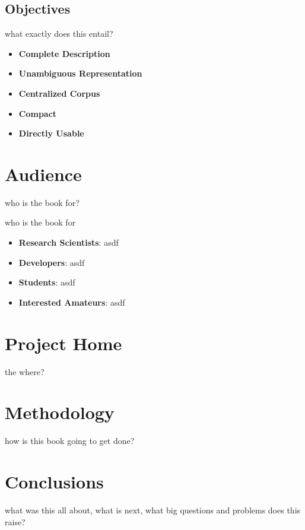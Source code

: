 \documentclass[a4paper, 11pt]{article}
\begin{document}
\subsection{Objectives}

what exactly does this entail?

\begin{itemize}
	\item \textbf{Complete Description}
	\item \textbf{Unambiguous Representation}
	\item \textbf{Centralized Corpus}
	\item \textbf{Compact}
	\item \textbf{Directly Usable}
\end{itemize}

\section{Audience}
\label{sec:audience}
who is the book for?

who is the book for 

\begin{itemize}
	\item \textbf{Research Scientists}: asdf
	\item \textbf{Developers}: asdf
	\item \textbf{Students}: asdf
	\item \textbf{Interested Amateurs}: asdf
\end{itemize}


\section{Project Home}
the where?

\section{Methodology}
\label{sec:methodology}
how is this book going to get done?


\section{Conclusions}
\label{sec:conclusions}
what was this all about, what is next, what big questions and problems does this raise?
\end{document}
